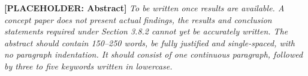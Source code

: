 {}
\vspace{3\baselineskip}
\noindent \textbf{[PLACEHOLDER: Abstract]} \textit{To be written once results are available. A concept paper does not present actual findings, the results and conclusion statements required under Section 3.8.2 cannot yet be accurately written. The abstract should contain 150–250 words, be fully justified and single-spaced, with no paragraph indentation. It should consist of one continuous paragraph, followed by three to five keywords written in lowercase.}

\vspace{\baselineskip}
\noindent